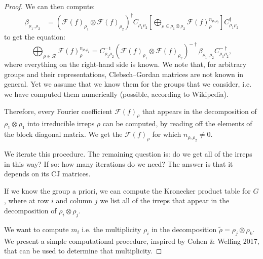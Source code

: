 \documentclass{article}
\begin{document}
\begin{proof}
    We can then compute:
    \begin{align*}
    \beta_{\rho_1, \rho_2}
    &=
    (\mathcal{F}(f)_{\rho_1} \otimes \mathcal{F}(f)_{\rho_2})^\dagger C_{{\rho_1} {\rho_2}}
    \left[
    \bigoplus_{\rho \in \rho_1 \otimes \rho_2}
        \mathcal{F}(f)_\rho^{n_{\rho, \rho_2}}
    \right] C_{{\rho_1} {\rho_2}}^{\dagger}
    \end{align*}
    to get the equation:
        \begin{equation}
        \bigoplus_{\rho \in \mathcal{R}}
        \mathcal{F}(f)_\rho^{n_{\rho, \rho_2}}
    = C_{{\rho_1} {\rho_2}}^{-1}(\mathcal{F}(f)_{\rho_1} \otimes \mathcal{F}(f)_{\rho_2})^{-\dagger} \beta_{\rho_1, \rho_2} C_{{\rho_1} {\rho_2}}^{-\dagger},
    \end{equation}
    where everything on the right-hand side is known. We note that, for arbitrary groups and their representations, Clebsch–Gordan matrices are not known in general. Yet we assume that we know them for the groups that we consider, i.e. we have computed them numerically (possible, according to Wikipedia).


    Therefore, every Fourier coefficient $\mathcal{F}(f)_\rho$ that appears in the decomposition of $\rho_1 \otimes \rho_1$ into irreducible irreps $\rho$ can be computed, by reading off the elements of the block diagonal matrix. We get the $\mathcal{F}(f)_\rho$ for which $n_{\rho, \rho_2} \neq 0$.

    We iterate this procedure. The remaining question is: do we get all of the irreps in this way? If so: how many iterations do we need? The answer is that it depends on its CJ matrices.

    If we know the group a priori, we can compute the Kronecker product table for $G$, where at row $i$ and column $j$ we list all of the irreps that appear in the decomposition of $\rho_i \otimes \rho_j$.

    We want to compute $m_i$ i.e. the multiplicity $\rho_i$ in the decomposition $\tilde \rho = \rho_j \otimes \rho_k$. We present a simple computational procedure, inspired by Cohen \& Welling 2017, that can be used to determine that multiplicity.


\end{proof}
\end{document}
